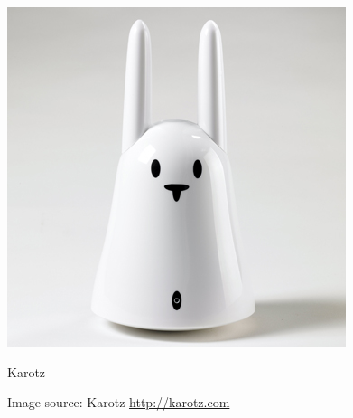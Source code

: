 \begin{figure}[H]
	\begin{minipage}[b]{0.4\linewidth}
		\centering
			\includegraphics[width=0.20\paperwidth]{Pictures/karotz.jpg}
		\caption{Karotz}
		\caption*{Image source: Karotz \url{http://karotz.com}}
		\label{fig:karotz}
	\end{minipage}
	\hspace{3cm}
	\begin{minipage}[b]{0.4\linewidth}
	\centering

\end{minipage}
\end{figure}
